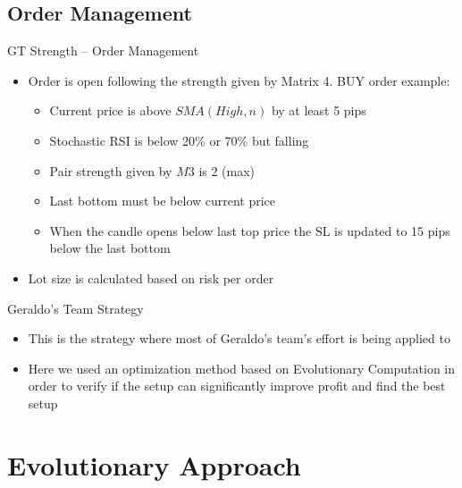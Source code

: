 \documentclass[12pt,portuguese]{beamer}
\begin{document}
\subsection{Order Management}
\begin{frame}{GT Strength -- Order Management}
\begin{itemize}
	\item Order is open following the strength given by Matrix 4. BUY order example:
		\begin{itemize}
			\item Current price is above $SMA(High, n)$ by at least 5 pips
			\item Stochastic RSI is below 20\% or 70\% but falling
			\item Pair strength given by $M3$ is 2 (max)
			\item Last bottom must be below current price
			\item When the candle opens below last top price the SL is updated to 15 pips below the last bottom
		\end{itemize}
	\item Lot size is calculated based on risk per order
\end{itemize}
\end{frame}

\begin{frame}{Geraldo's Team Strategy}
\begin{itemize}
	\item This is the strategy where most of Geraldo's team's effort is being applied to
	\item Here we used an optimization method based on Evolutionary Computation in order to verify if the setup can significantly improve profit and find the best setup
\end{itemize}
\end{frame}

\section{Evolutionary Approach}
\end{document}
